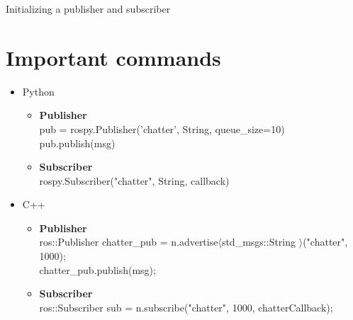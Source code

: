 \documentclass{beamer}
\begin{document}
\begin{frame}[fragile]{Initializing a publisher and subscriber}
\section{Important commands}
\begin{itemize}
	\item {Python\\
	\begin{itemize}
		\item{\textbf{Publisher}}\\
		\footnotesize{pub = rospy.Publisher('chatter', String, queue\_size=10)}	\\
		\footnotesize{pub.publish(msg)}	\\
		
		\item{\textbf{Subscriber}}\\
		\footnotesize{rospy.Subscriber("chatter", String, callback)}	
	\end{itemize}
	}

	\item {C++ \\	
	\begin{itemize}
		\item{\textbf{Publisher}}\\
		\footnotesize{ros::Publisher chatter\_pub = n.advertise$\langle$std\_msgs::String $\rangle$("chatter", 1000);}	\\
		\footnotesize{chatter\_pub.publish(msg);}
		
		\item{\textbf{Subscriber}}\\
		\footnotesize{ros::Subscriber sub = n.subscribe("chatter", 1000, chatterCallback);}	
	\end{itemize}
}
\end{itemize}
\end{frame}	
\end{document}
